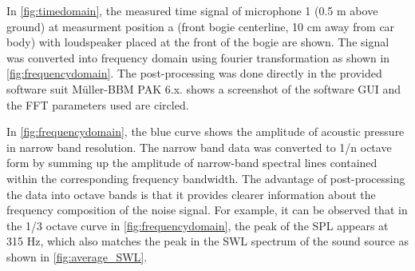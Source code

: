 In \cref{fig:timedomain}, the measured time signal of microphone 1 (0.5 m above ground) at measurment position a (front bogie centerline, 10 cm away from car body) with loudspeaker placed at the front of the bogie are shown. The signal was converted into frequency domain using fourier transformation as shown in \cref{fig:frequencydomain}. The post-processing was done directly in the provided software suit Müller-BBM PAK 6.x.  shows a screenshot of the software GUI and the FFT parameters used are circled.

In \cref{fig:frequencydomain}, the blue curve shows the amplitude of acoustic pressure in narrow band resolution. The narrow band data was converted to 1/n octave form by summing up the amplitude of narrow-band spectral lines contained within the corresponding frequency bandwidth. The advantage of post-processing the data into octave bands is that it provides clearer information about the frequency composition of the noise signal. For example, it can be observed that in the 1/3 octave curve in \cref{fig:frequencydomain}, the peak of the SPL appears at 315 Hz, which also matches the peak in the SWL spectrum of the sound source as shown in \cref{fig:average_SWL}.

